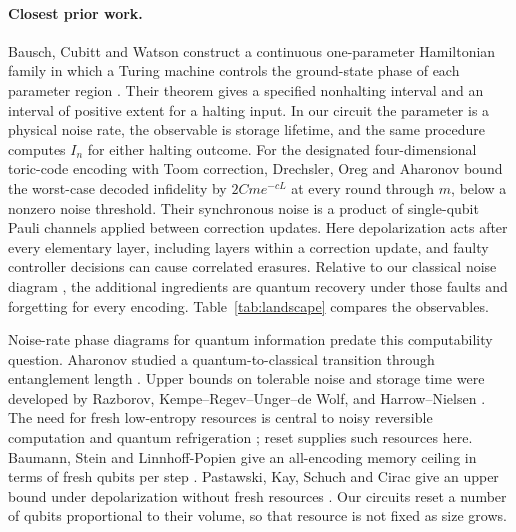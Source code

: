 \paragraph{Closest prior work.}
Bausch, Cubitt and Watson construct a continuous one-parameter Hamiltonian family in which a Turing machine controls the ground-state phase of each parameter region \cite[Theorem~2.1]{BCW2021}. Their theorem gives a specified nonhalting interval and an interval of positive extent for a halting input. In our circuit the parameter is a physical noise rate, the observable is storage lifetime, and the same procedure computes \(I_n\) for either halting outcome. For the designated four-dimensional toric-code encoding with Toom correction, Drechsler, Oreg and Aharonov \cite[Section~3.2]{DOA2026} bound the worst-case decoded infidelity by \(2Cme^{-cL}\) at every round through \(m\), below a nonzero noise threshold. Their synchronous noise is a product of single-qubit Pauli channels applied between correction updates. Here depolarization acts after every elementary layer, including layers within a correction update, and faulty controller decisions can cause correlated erasures. Relative to our classical noise diagram \cite{DMNoise2026}, the additional ingredients are quantum recovery under those faults and forgetting for every encoding. Table~\ref{tab:landscape} compares the observables.

Noise-rate phase diagrams for quantum information predate this computability question. Aharonov studied a quantum-to-classical transition through entanglement length \cite{Aharonov2000}. Upper bounds on tolerable noise and storage time were developed by Razborov, Kempe--Regev--Unger--de Wolf, and Harrow--Nielsen \cite{HarrowNielsen2003,KRWdW2010,Razborov2004}. The need for fresh low-entropy resources is central to noisy reversible computation and quantum refrigeration \cite{ABIN1996,BGH2013}; reset supplies such resources here. Baumann, Stein and Linnhoff-Popien give an all-encoding memory ceiling in terms of fresh qubits per step \cite{BSL2026}. Pastawski, Kay, Schuch and Cirac give an upper bound under depolarization without fresh resources \cite{PKSC2009}. Our circuits reset a number of qubits proportional to their volume, so that resource is not fixed as size grows.

